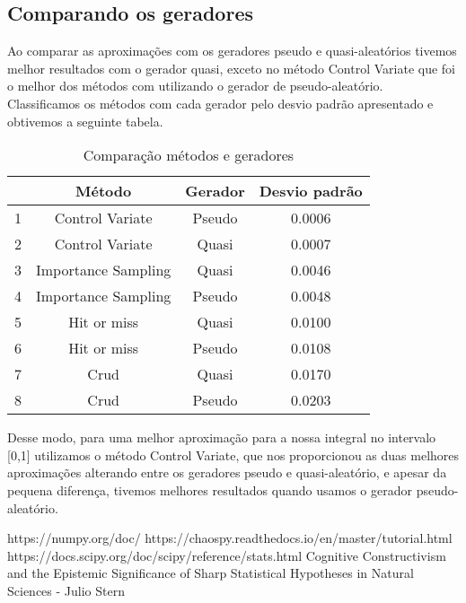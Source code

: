 \documentclass{article}
\begin{document}
\subsection{Comparando os geradores}
Ao comparar as aproximações com os geradores pseudo e quasi-aleatórios tivemos melhor resultados com o gerador quasi, exceto no método Control Variate que foi o melhor dos métodos com utilizando o gerador de pseudo-aleatório. Classificamos os métodos com cada gerador pelo desvio padrão apresentado e obtivemos a seguinte tabela.

\hfill


\begin{table}[ht]
    \centering
    \begin{tabular}{c|c|c|c}
         & Método & Gerador & Desvio padrão \\
        \hline
        1 & Control Variate & Pseudo & 0.0006 \\
        \hline
        2 & Control Variate & Quasi & 0.0007 \\
        \hline
        3 & Importance Sampling & Quasi & 0.0046 \\
        \hline
        4 & Importance Sampling & Pseudo & 0.0048 \\
        \hline
        5 & Hit or miss & Quasi & 0.0100 \\
        \hline
        6 & Hit or miss & Pseudo & 0.0108 \\
        \hline
        7 & Crud & Quasi & 0.0170 \\
        \hline
        8 & Crud & Pseudo & 0.0203 \\
        
    \end{tabular}
    \caption{Comparação métodos e geradores}
    \label{tab:my_label}
\end{table}

Desse modo, para uma melhor aproximação para a nossa integral no intervalo [0,1] utilizamos o método Control Variate, que nos proporcionou as duas melhores aproximações alterando entre os geradores pseudo e quasi-aleatório, e apesar da pequena diferença, tivemos melhores resultados quando usamos o gerador pseudo-aleatório.



\begin{thebibliography}{4}

https://numpy.org/doc/
https://chaospy.readthedocs.io/en/master/tutorial.html
https://docs.scipy.org/doc/scipy/reference/stats.html
Cognitive Constructivism and the Epistemic Significance of Sharp Statistical Hypotheses in Natural Sciences - Julio Stern

\end{thebibliography}

    
\end{document}
